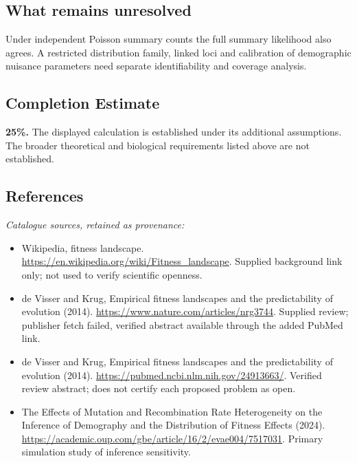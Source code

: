 \documentclass[11pt]{article}
\begin{document}
\subsection{What remains unresolved}
Under independent Poisson summary counts the full summary likelihood also agrees. A restricted distribution family, linked loci and calibration of demographic nuisance parameters need separate identifiability and coverage analysis.
\subsection{Completion Estimate}
\textbf{25\%.} The displayed calculation is established under its additional assumptions. The broader theoretical and biological requirements listed above are not established.
\subsection{References}
\noindent\emph{Catalogue sources, retained as provenance:}
\begin{itemize}
\item Wikipedia, fitness landscape. \url{https://en.wikipedia.org/wiki/Fitness_landscape}. Supplied background link only; not used to verify scientific openness.
\item de Visser and Krug, Empirical fitness landscapes and the predictability of evolution (2014). \url{https://www.nature.com/articles/nrg3744}. Supplied review; publisher fetch failed, verified abstract available through the added PubMed link.
\item de Visser and Krug, Empirical fitness landscapes and the predictability of evolution (2014). \url{https://pubmed.ncbi.nlm.nih.gov/24913663/}. Verified review abstract; does not certify each proposed problem as open.
\item The Effects of Mutation and Recombination Rate Heterogeneity on the Inference of Demography and the Distribution of Fitness Effects (2024). \url{https://academic.oup.com/gbe/article/16/2/evae004/7517031}. Primary simulation study of inference sensitivity.
\end{itemize}
\clearpage


\appendix
\end{document}
